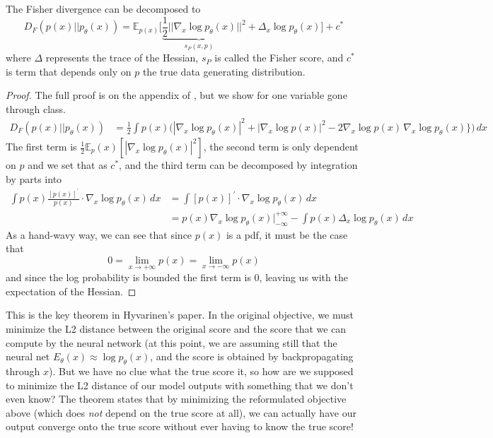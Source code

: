 \documentclass{article}
\begin{document}
    \begin{theorem}
      The Fisher divergence can be decomposed to 
      \begin{equation}
        D_F (p(x) || p_\theta (x)) = \mathbb{E}_{p(x)} \bigg[ \underbrace{\frac{1}{2} || \nabla_x \log p_\theta (x)}_{s_P (x, p)} ||^2 + \Delta_x \log p_\theta (x) \bigg] + c^\ast
      \end{equation}
      where $\Delta$ represents the trace of the Hessian, $s_P$ is called the Fisher score, and $c^\ast$ is  term that depends only on $p$ the true data generating distribution. 
    \end{theorem}
    \begin{proof}
      The full proof is on the appendix of \cite{orig_score}, but we show for one variable gone through class. 
      \begin{align}
        D_F (p(x) || p_\theta (x)) & = \frac{1}{2} \int p(x) \big( |\nabla_x \log p_\theta (x)|^2 + | \nabla_x \log p(x) |^2 - 2 \nabla_x \log p(x) \, \nabla_x \log p_\theta (x)\} \big) \,dx
      \end{align}
      The first term is $\frac{1}{2} \mathbb{E}_p(x) [|\nabla_x \log p_\theta (x)|^2]$, the second term is only dependent on $p$ and we set that as $c^\ast$, and the third term can be decomposed by integration by parts into  
      \begin{align}
        \int p(x) \frac{[p(x)]^\prime}{p(x)} \cdot \nabla_x \log p_\theta (x) \,dx & = \int [p(x)]^\prime \cdot \nabla_x \log p_\theta (x) \,dx \\ 
                                           & = p(x) \nabla_x \log p_\theta (x) \Big|_{-\infty}^{+\infty} - \int p(x) \Delta_x \log p_\theta (x) \,dx 
      \end{align}
      As a hand-wavy way, we can see that since $p(x)$ is a pdf, it must be the case that 
      \begin{equation}
        0 = \lim_{x \rightarrow +\infty} p(x) = \lim_{x \rightarrow -\infty} p(x) 
      \end{equation}
      and since the log probability is bounded the first term is $0$, leaving us with the expectation of the Hessian. 
    \end{proof} 

    This is the key theorem in Hyvarinen's paper. In the original objective, we must minimize the L2 distance between the original score and the score that we can compute by the neural network (at this point, we are assuming still that the neural net $E_\theta (x) \approx \log p_\theta (x)$, and the score is obtained by backpropagating through $x$). But we have no clue what the true score it, so how are we supposed to minimize the L2 distance of our model outputs with something that we don't even know? The theorem states that by minimizing the reformulated objective above (which does \textit{not} depend on the true score at all), we can actually have our output converge onto the true score without ever having to know the true score! 
\end{document}
